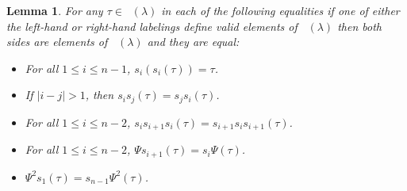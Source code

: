 \documentclass[pdftex]{sigma}
\numberwithin{equation}{section}
\newtheorem{Lemma}[Theorem]{Lemma}
\theoremstyle{definition}
\DeclareMathOperator{\PSYT}{\mathrm{PSYT}_{\geq 0}}
\begin{document}
\begin{Lemma}
For any $\tau \in \PSYT(\lambda)$ in each of the following equalities if one of either the left-hand or right-hand labelings define valid elements of $\PSYT(\lambda)$ then both sides are elements of $\PSYT(\lambda)$ and they are equal:
\begin{itemize}
\itemsep=0pt
 \item For all $1\leq i \leq n-1$, $s_i(s_i(\tau)) = \tau$.
 \item If $|i-j|>1$, then $s_is_j(\tau) = s_js_i(\tau)$.
 \item For all $1\leq i \leq n-2$, $s_is_{i+1}s_i(\tau) = s_{i+1}s_is_{i+1}(\tau)$.
 \item For all $1\leq i \leq n-2$, $\Psi s_{i+1}(\tau) = s_i\Psi(\tau)$.
 \item $\Psi^2 s_1(\tau) = s_{n-1}\Psi^2(\tau)$.
\end{itemize}

\end{Lemma}
\end{document}
